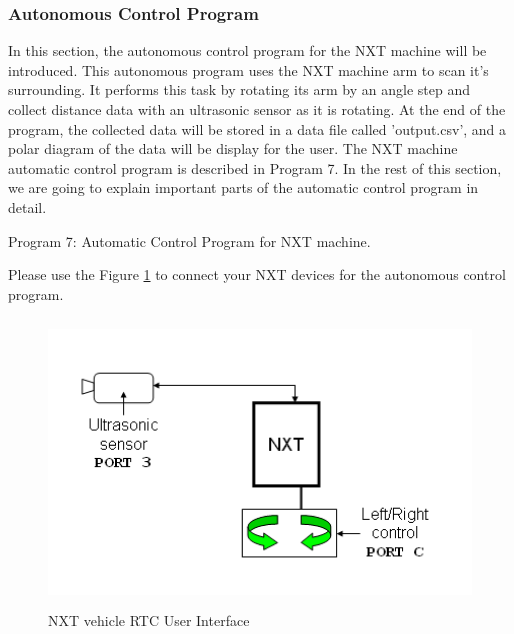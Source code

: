 \documentclass[12pt]{article}
\begin{document}
\subsubsection{Autonomous Control Program}
In this section, the autonomous control program for the NXT machine will be introduced.
This autonomous program uses the NXT machine arm to scan it's surrounding.
It performs this task by rotating its arm by an angle step and collect distance data with an
    ultrasonic sensor as it is rotating.
At the end of the program, the collected data will be stored in a data file called 'output.csv', and
    a polar diagram of the data will be display for the user.
The NXT machine automatic control program is described in Program 7.
In the rest of this section, we are going to explain important parts of the automatic control program in detail.

\begin{center}
Program 7: Automatic Control Program for NXT machine.
\end{center}
Please use the Figure \ref{fig_NXT_machauto_port} to connect your NXT devices for the autonomous
    control program.

\begin{figure}[h]
  \begin{center}
    \includegraphics[height=3in]{figure/mindstorm/NXT_machauto_port.png}
    \caption{NXT vehicle RTC User Interface \label{fig_NXT_machauto_port}}
  \end{center}
\end{figure}
\end{document}
